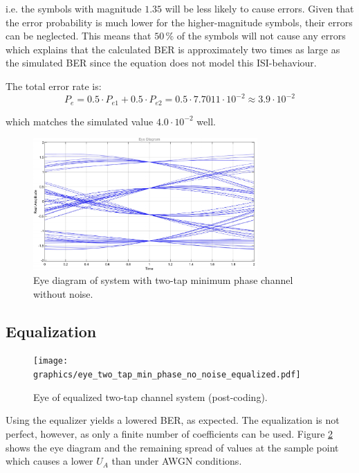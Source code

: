 \documentclass[10pt, a4paper]{article}
\begin{document}
i.e. the symbols with magnitude $1.35$ will be less likely to cause errors. Given that the error probability is much lower for the higher-magnitude symbols, their errors can be neglected. This means that $50\,\si{\percent}$ of the symbols will not cause any errors which explains that the calculated BER is approximately two times as large as the simulated BER since the equation does not model this ISI-behaviour.

The total error rate is:
\[P_{e} = 0.5 \cdot P_{e1} + 0.5 \cdot P_{e2} = 0.5\cdot 7.7011 \cdot 10^{-2} \approx 3.9 \cdot 10^{-2}\]

which matches the simulated value $4.0\cdot 10^{-2}$ well.

\begin{figure}%
\centering
\includegraphics[width=0.764\textwidth]{graphics/eye_two_tap_min_phase_no_noise.pdf}
\caption{Eye diagram of system with two-tap minimum phase channel without noise.}\label{fig:min_phase_eye_no_noise}
\end{figure}


\subsection{Equalization}

\begin{figure}%
\centering
\texttt{[image: graphics/eye\_two\_tap\_min\_phase\_no\_noise\_equalized.pdf]}
\caption{Eye of equalized two-tap channel system (post-coding).}\label{fig:min_phase_eye_no_noise_equalized}
\end{figure}

Using the equalizer yields a lowered BER, as expected. The equalization is not perfect, however, as only a finite number of coefficients can be used. Figure \ref{fig:min_phase_eye_no_noise_equalized} shows the eye diagram and the remaining spread of values at the sample point which causes a lower $U_{A}$ than under AWGN conditions.
\end{document}
